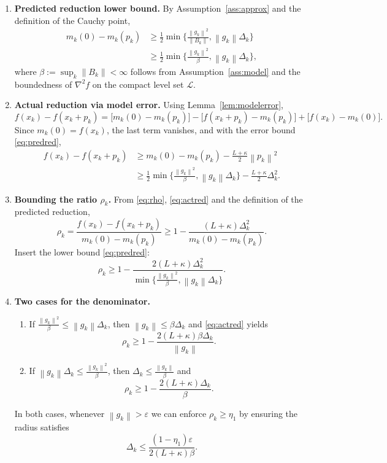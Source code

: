 \documentclass{article}
\newcommand{\norm}[1]{\left\lVert#1\right\rVert}
\begin{document}
\begin{enumerate}
\item[Step 1.] \textbf{Predicted reduction lower bound.}  
By Assumption~\ref{ass:approx} and the definition of the Cauchy point,
\begin{align}
m_k(0)-m_k(p_k) 
&\ge \frac12\min\!\Big\{\frac{\norm{g_k}^{2}}{\|B_k\|},
           \norm{g_k}\Delta_k\Big\} \label{eq:predred}\\
&\ge \frac12\min\!\Big\{\frac{\norm{g_k}^{2}}{\beta},
           \norm{g_k}\Delta_k\Big\},
\end{align}
where $\beta:=\sup_k\|B_k\|<\infty$ follows from
Assumption~\ref{ass:model} and the boundedness of $\nabla^{2}f$ on the
compact level set $\mathcal{L}$.

\item[Step 2.] \textbf{Actual reduction via model error.}  
Using Lemma~\ref{lem:modelerror},
\[
f(x_k)-f(x_k+p_k)
= \big[m_k(0)-m_k(p_k)\big] 
   -\big[ f(x_k+p_k)-m_k(p_k) \big]
   +\big[ f(x_k)-m_k(0) \big].
\]
Since $m_k(0)=f(x_k)$, the last term vanishes, and with the error bound
\eqref{eq:predred},
\begin{align}
f(x_k)-f(x_k+p_k)
&\ge m_k(0)-m_k(p_k)-\frac{L+\kappa}{2}\norm{p_k}^{2} \nonumber\\
&\ge \frac12\min\!\Big\{\frac{\norm{g_k}^{2}}{\beta},
           \norm{g_k}\Delta_k\Big\}
   -\frac{L+\kappa}{2}\Delta_k^{2}. \label{eq:actred}
\end{align}

\item[Step 3.] \textbf{Bounding the ratio $\rho_k$.}  
From \eqref{eq:rho}, \eqref{eq:actred} and the definition of the
predicted reduction,
\[
\rho_k
= \frac{f(x_k)-f(x_k+p_k)}{m_k(0)-m_k(p_k)}
\ge 1-\frac{(L+\kappa)\Delta_k^{2}}
            {m_k(0)-m_k(p_k)}.
\]
Insert the lower bound \eqref{eq:predred}:
\[
\rho_k \ge 1-
\frac{2(L+\kappa)\Delta_k^{2}}
     {\min\!\big\{\frac{\norm{g_k}^{2}}{\beta},
                \norm{g_k}\Delta_k\big\}}.
\tag{3.1}
\]

\item[Step 4.] \textbf{Two cases for the denominator.}
\begin{enumerate}[label=(\alph*)]
\item If $\frac{\norm{g_k}^{2}}{\beta}\le \norm{g_k}\Delta_k$,
then $\norm{g_k}\le\beta\Delta_k$ and \eqref{eq:actred} yields
\[
\rho_k\ge 1-
\frac{2(L+\kappa)\beta\Delta_k}{\norm{g_k}}.
\]
\item If $\norm{g_k}\Delta_k\le\frac{\norm{g_k}^{2}}{\beta}$,
then $\Delta_k\le\frac{\norm{g_k}}{\beta}$ and
\[
\rho_k\ge 1-
\frac{2(L+\kappa)\Delta_k}{\beta}.
\]
\end{enumerate}
In both cases, whenever $\norm{g_k}>\varepsilon$ we can enforce
$\rho_k\ge\eta_1$ by ensuring the radius satisfies
\[
\Delta_k \le
\frac{(1-\eta_1)\varepsilon}{2(L+\kappa)\beta}. \tag{4.1}
\]


\end{enumerate}
\end{document}
